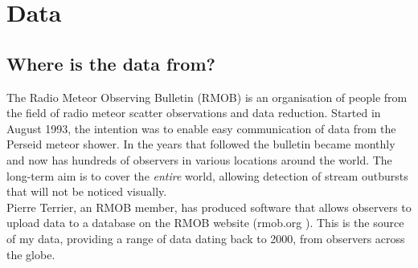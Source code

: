 \chapter{Data}
\label{chap:data}
\section{Where is the data from?}
The Radio Meteor Observing Bulletin (RMOB) \cite{rmob} is an organisation of people from the field of radio meteor scatter observations and data reduction. Started in August 1993, the intention was to enable easy communication of data from the Perseid meteor shower. In the years that followed the bulletin became monthly and now has hundreds of observers in various locations around the world. The long-term aim is to cover the {\it entire} world, allowing detection of stream outbursts that will not be noticed visually.\\
Pierre Terrier, an RMOB member, has produced software that allows observers to upload data to a database on the RMOB website (rmob.org \cite{rmob}). This is the source of my data, providing a range of data dating back to 2000, from observers across the globe.
